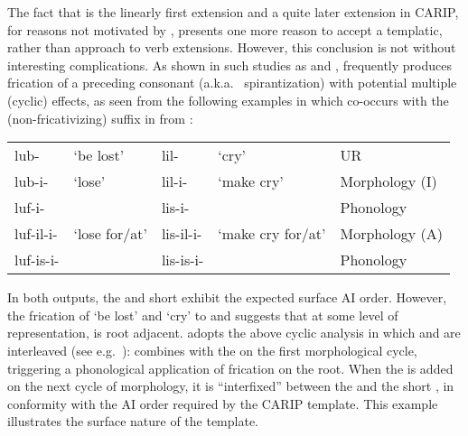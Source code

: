 \documentclass[output=paper,
modfonts
]{LSP/langsci}
\begin{document}
\noindent The fact that  is the linearly first extension and 
a quite later extension in CARIP, for reasons not motivated by ,
presents one more reason to accept a templatic, rather than
 approach to  verb extensions. However, this
conclusion is not without interesting complications. As shown in such
studies as \citet{hyman1994,hyman2003c} and \citet{downing2005j},  frequently
produces frication of a preceding consonant (a.k.a.\ 
spirantization) with potential multiple (cyclic) effects, as seen from
the following examples in which  co-occurs with the
(non-fricativizing)   suffix in  from :

\ea \label{ex:hyman:7}
\begin{tabular}[t]{@{}lllll}
	lub-  & `be lost' & lil-  & `cry' & UR \\
	lub-i- & `lose' & lil-i- & `make cry' & Morphology  (I)\\
	luf-i- &       & lis-i- &       & Phonology \\
	luf-il-i- & `lose for/at' & lis-il-i- & `make cry for/at' & Morphology (A) \\
	luf-is-i- &       & lis-is-i- &       & Phonology \\
\end{tabular}%
\z


In both outputs, the  and short  exhibit the
expected surface AI order. However, the frication of  `be
lost' and  `cry' to  and  suggests that
at some level of representation,  is root adjacent. \citet{hyman1994} adopts the above cyclic analysis in which  and
 are interleaved (see e.g.\ \citealt{kiparsky1982h}):  combines
with the  on the first morphological cycle, triggering a
phonological application of frication on the root. When the 
is added on the next cycle of morphology, it is ``interfixed'' between
the  and the short , in conformity with the AI order
required by the CARIP template. This example illustrates the surface
nature of the template.
\end{document}
